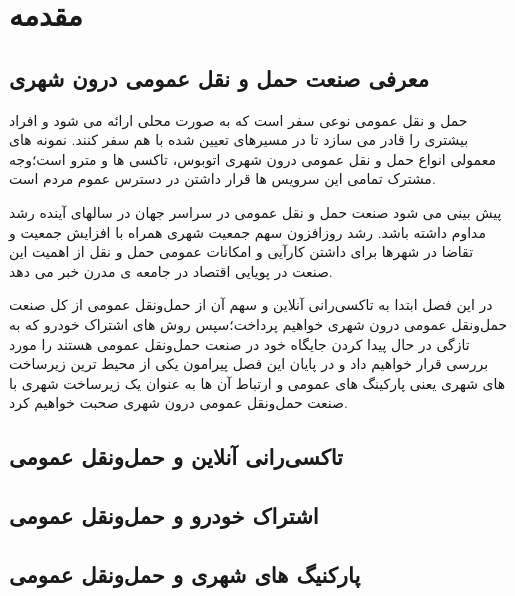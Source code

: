 \chapter{مقدمه}

\section{معرفی صنعت حمل و نقل عمومی درون شهری}
حمل و نقل عمومی نوعی سفر است که به صورت محلی ارائه می شود و افراد بیشتری را قادر می سازد تا در مسیرهای تعیین شده با هم سفر کنند. نمونه های معمولی انواع حمل و نقل عمومی درون شهری اتوبوس، تاکسی ها و مترو است؛‌وجه مشترک تمامی این سرویس ها قرار داشتن در دسترس عموم مردم است.

پیش بینی می شود صنعت حمل و نقل عمومی در سراسر جهان در سالهای آینده رشد مداوم داشته باشد. رشد روزافزون سهم جمعیت شهری همراه با افزایش جمعیت و تقاضا در شهرها برای داشتن کارآیی و امکانات عمومی حمل و نقل از اهمیت این صنعت در پویایی اقتصاد در جامعه ی مدرن خبر می دهد.

در این فصل ابتدا به تاکسی‌رانی آنلاین و سهم آن از حمل‌و‌نقل عمومی از کل صنعت حمل‌و‌نقل عمومی درون شهری خواهیم پرداخت؛سپس روش های اشتراک خودرو که به تازگی در حال پیدا کردن جایگاه خود در صنعت حمل‌و‌نقل عمومی هستند را مورد بررسی قرار خواهیم داد و در پایان این فصل پیرامون یکی از محیط ترین زیرساخت های شهری یعنی پارکینگ های عمومی و ارتباط آن ها به عنوان یک زیرساخت شهری با صنعت حمل‌و‌نقل عمومی درون شهری صحبت خواهیم کرد.

\section{تاکسی‌رانی آنلاین و حمل‌و‌نقل عمومی}

\section{اشتراک خودرو و حمل‌و‌نقل عمومی}

\section{پارکنیگ های شهری و حمل‌و‌نقل عمومی}